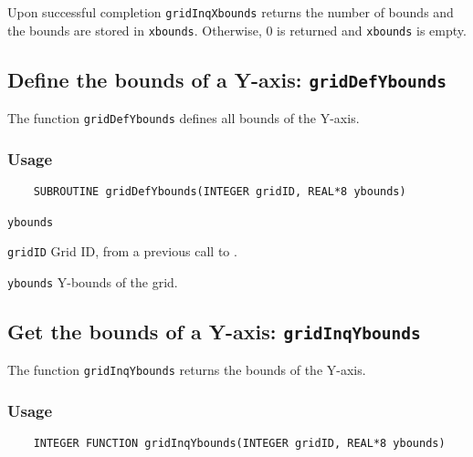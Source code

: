Upon successful completion {\texttt{gridInqXbounds}} returns the number of bounds and
the bounds are stored in {\texttt{xbounds}}.
Otherwise, 0 is returned and {\texttt{xbounds}} is empty.



\subsection{Define the bounds of a Y-axis: \texttt{gridDefYbounds}}
\label{gridDefYbounds}

The function {\texttt{gridDefYbounds}} defines all bounds of the Y-axis.

\subsubsection*{Usage}

\begin{verbatim}
    SUBROUTINE gridDefYbounds(INTEGER gridID, REAL*8 ybounds)
\end{verbatim}

\hspace*{4mm}\begin{minipage}[]{15cm}
\begin{deflist}{\texttt{ybounds}\ }
\item[\texttt{gridID}]
Grid ID, from a previous call to {}.
\item[\texttt{ybounds}]
Y-bounds of the grid.

\end{deflist}
\end{minipage}


\subsection{Get the bounds of a Y-axis: \texttt{gridInqYbounds}}
\label{gridInqYbounds}

The function {\texttt{gridInqYbounds}} returns the bounds of the Y-axis.

\subsubsection*{Usage}

\begin{verbatim}
    INTEGER FUNCTION gridInqYbounds(INTEGER gridID, REAL*8 ybounds)
\end{verbatim}

